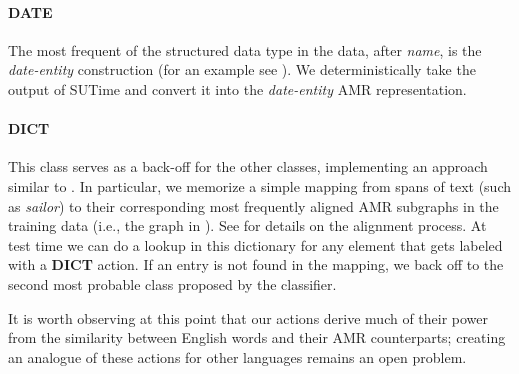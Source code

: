 \documentclass[11pt]{article}
\newcommand\w[1]{\textit{#1}} %
\newcommand\n[1]{\textit{#1}} %
\begin{document}
\paragraph{DATE} The most frequent of the structured data type in the data, after \n{name}, is the \n{date-entity} construction (for an example see ).
We deterministically take the output of SUTime \cite{2012chang-temporal}
  and convert it into the \n{date-entity} AMR representation.

\paragraph{DICT} This class serves as a back-off for the other classes, implementing
an approach similar to .
In particular, we memorize a simple mapping from spans of text
  (such as \w{sailor}) to their corresponding most frequently aligned AMR subgraphs 
  in the training data (i.e., the graph in ). 
See  for details on the alignment process.
At test time we can do a lookup in this dictionary for any element that gets 
  labeled with a \textbf{DICT} action. 
If an entry is not found in the mapping, we back off to the second most probable
  class proposed by the classifier.

It is worth observing at this point that our actions derive much of their power from the similarity 
  between English words and their AMR counterparts; creating an analogue of these actions for other
  languages remains an open problem. %

%
%

\end{document}
